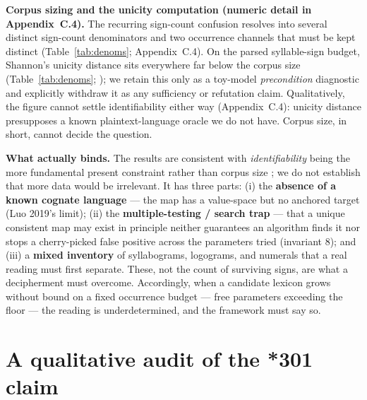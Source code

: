 \textbf{Corpus sizing and the unicity computation (numeric detail in
Appendix~C.4).} The recurring sign-count confusion resolves into several
distinct sign-count denominators and two occurrence channels that must be
kept distinct (Table~\ref{tab:denoms}; Appendix~C.4). On the parsed
syllable-sign budget, Shannon's unicity distance sits everywhere far
below the corpus size (Table~\ref{tab:denoms};
\citealp[\S1--3]{salgarella2025}); we retain
this only as a toy-model \emph{precondition} diagnostic and explicitly
withdraw it as any sufficiency or refutation claim. Qualitatively, the
figure cannot settle identifiability either way (Appendix~C.4): unicity
distance presupposes a known plaintext-language oracle we do not have.
Corpus size, in short, cannot decide the question.

\textbf{What actually binds.} The results are consistent with
\emph{identifiability} being the more fundamental present constraint rather
than corpus size \citep[\S8]{salgarella2025}; we do not establish that more
data would be irrelevant. It has three parts: (i) the \textbf{absence of a
known cognate language} --- the map has a value-space but no anchored
target (Luo 2019's limit); (ii) the \textbf{multiple-testing / search
trap} --- that a unique consistent map may exist in principle neither
guarantees an algorithm finds it nor stops a cherry-picked false positive
across the parameters tried (invariant 8); and (iii) a \textbf{mixed
inventory} of syllabograms, logograms, and numerals that a real reading
must first separate. These, not the count of surviving signs, are what a
decipherment must overcome. Accordingly, when a candidate lexicon grows
without bound on a fixed occurrence budget --- free parameters exceeding
the floor --- the reading is underdetermined, and the framework must say
so.

\section{A qualitative audit of the *301 claim}

